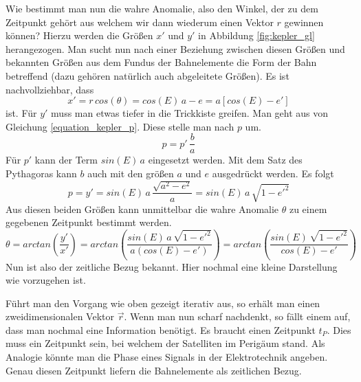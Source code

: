 \newpar
Wie bestimmt man nun die wahre Anomalie, also den Winkel, der zu dem Zeitpunkt gehört aus welchem wir dann wiederum einen Vektor \ensuremath{r} gewinnen können? Hierzu werden die Größen \ensuremath{x'} und \ensuremath{y'} in Abbildung \ref{fig:kepler_gl} herangezogen. Man sucht nun nach einer Beziehung zwischen diesen Größen und bekannten Größen aus dem Fundus der Bahnelemente die Form der Bahn betreffend (dazu gehören natürlich auch abgeleitete Größen). 
Es ist nachvollziehbar, dass 
\begin{equation}
	x'=r\,cos(\theta)=cos(E)\,a-e=a\left[cos(E)-e'\right]
\end{equation}
ist. Für \ensuremath{y'} muss man etwas tiefer in die Trickkiste greifen. Man geht aus von Gleichung \ref{equation_kepler_p}. Diese stelle man nach \ensuremath{p} um.
\begin{equation}
	p=p'\,\frac{b}{a}
\end{equation} 
Für \ensuremath{p'} kann der Term \ensuremath{sin(E)\,a} eingesetzt werden. Mit dem Satz des Pythagoras kann \ensuremath{b} auch mit den größen \ensuremath{a} und \ensuremath{e} ausgedrückt werden. Es folgt  
\begin{equation}
	p=y'=sin(E)\,a\,\frac{\sqrt{a^2-e^2}}{a}=sin(E)\,a\,\sqrt{1-e'^2}
\end{equation} 
Aus diesen beiden Größen kann unmittelbar die wahre Anomalie \ensuremath{\theta} zu einem gegebenen Zeitpunkt bestimmt werden.
\begin{equation}
	\theta=arctan\left(\frac{y'}{x'}\right)=arctan\left(\frac{sin(E)\,a\,\sqrt{1-e'^2}}{a\left(cos(E)-e'\right)}\right)=arctan\left(\frac{sin(E)\,\sqrt{1-e'^2}}{cos(E)-e'}\right)
\end{equation}
\newpar
Nun ist also der zeitliche Bezug bekannt. Hier nochmal eine kleine Darstellung wie vorzugehen ist.
\begin{center}
\end{center}
Führt man den Vorgang wie oben gezeigt iterativ aus, so erhält man einen zweidimensionalen Vektor \ensuremath{\vec{r}}. Wenn man nun scharf nachdenkt, so fällt einem auf, dass man nochmal eine Information benötigt. Es braucht einen Zeitpunkt \ensuremath{t_P}. Dies muss ein Zeitpunkt sein, bei welchem der Satelliten im Perigäum stand. Als Analogie könnte man die Phase eines Signals in der Elektrotechnik angeben. Genau diesen Zeitpunkt liefern die Bahnelemente als zeitlichen Bezug.

